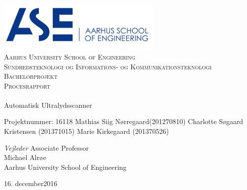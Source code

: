 \begin{titlingpage}
\begin{center}

~ \\[3cm]

\includegraphics[width=0.6\textwidth]{figurer/ASE}~\\[1cm]

\textsc{\LARGE Aarhus University School of Engineering}\\[1.5cm]

\textsc{\Large Sundhedsteknologi og Informations- og Kommunikationsteknologi}\\
\textsc{\Large Bachelorprojekt}\\[0.5cm]
\textsc{\Large Procesrapport} \\[1cm]

\noindent\makebox[\linewidth]{\rule{\textwidth}{0.4pt}}\\
[0.5cm]{\Huge Automatisk Ultralydsscanner}
\noindent\makebox[\linewidth]{\rule{\textwidth}{0.4pt}}

\end{center}
Projektnummer: 16118 \newline
Mathias Siig Nørregaard(201270810) \newline
Charlotte Søgaard Kristensen (201371015) \newline		 
Marie Kirkegaard (201370526) \newline 


\textit{Vejleder} \newline
Associate Professor\\
Michael Alrøe\\
Aarhus University School of Engineering


\vfill

\begin{center}
{\large 16. december2016}
\end{center}

\end{titlingpage}
